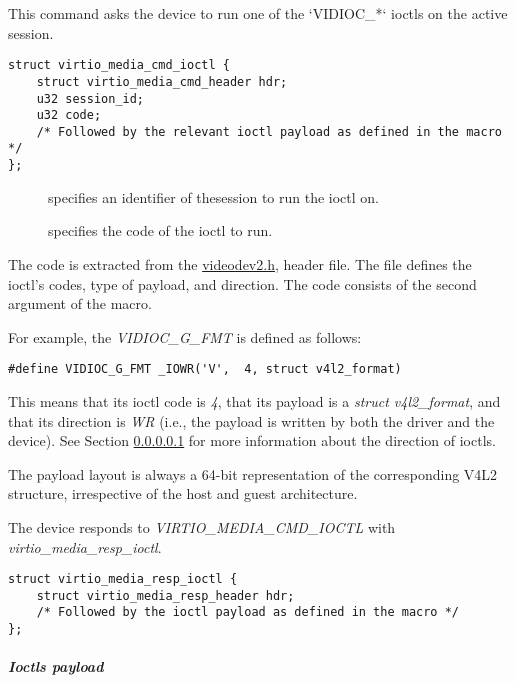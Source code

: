 This command asks the device to run one of the `VIDIOC_*` ioctls on the active
session.

\begin{lstlisting}
struct virtio_media_cmd_ioctl {
    struct virtio_media_cmd_header hdr;
    u32 session_id;
    u32 code;
    /* Followed by the relevant ioctl payload as defined in the macro */
};
\end{lstlisting}

\begin{description}
\item[] specifies an identifier of thesession to run the ioctl on.
\item[] specifies the code of the  ioctl to run.
\end{description}

The code is extracted from the
\href{https://www.kernel.org/doc/html/latest/userspace-api/media/v4l/videodev.html}{videodev2.h},
header file. The file defines the ioctl's codes, type of payload, and
direction. The code consists of the second argument of the  macro.

For example, the \textit{VIDIOC_G_FMT} is defined as follows:

\begin{lstlisting}
#define VIDIOC_G_FMT _IOWR('V',  4, struct v4l2_format)
\end{lstlisting}

This means that its ioctl code is \textit{4}, that its payload is a
\textit{struct v4l2_format}, and that its direction is \textit{WR} (i.e., the
payload is written by both the driver and the device).
See Section \ref{sec:Device Types / Media Device / V4L2 ioctls / Ioctls payload}
for more information about the direction of ioctls.

The payload layout is always a 64-bit representation of the corresponding
V4L2 structure, irrespective of the host and guest architecture.

The device responds to \textit{VIRTIO_MEDIA_CMD_IOCTL} with \textit{virtio_media_resp_ioctl}.

\begin{lstlisting}
struct virtio_media_resp_ioctl {
    struct virtio_media_resp_header hdr;
    /* Followed by the ioctl payload as defined in the macro */
};
\end{lstlisting}

\subparagraph{Ioctls payload}\label{sec:Device Types / Media Device / V4L2 ioctls / Ioctls payload}

